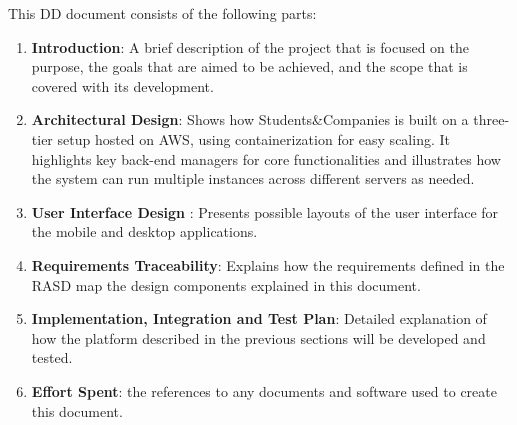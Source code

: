 \renewcommand{\arraystretch}{1.6}
This DD document consists of the following parts:
\begin{enumerate}
    \item \textbf{Introduction}: A brief description of the project that is focused on the purpose, the goals that are aimed to be achieved, and the scope that is covered with its development.
    \item \textbf{Architectural Design}: Shows how Students\&Companies is built on a three-tier setup hosted on AWS, using containerization for easy scaling. It highlights key back-end managers for core functionalities and illustrates how the system can run multiple instances across different servers as needed.
    \item \textbf{User Interface Design }: Presents possible layouts of the user interface for the mobile and
desktop applications.
    \item \textbf{Requirements Traceability}: Explains how the requirements defined in the RASD map the design components explained in this document.
    \item \textbf{ Implementation, Integration and Test Plan}: Detailed explanation of how the platform described in the previous sections will be developed and tested.
    \item \textbf{ Effort Spent}: the references to any documents and software used to create this document.
\end{enumerate}
